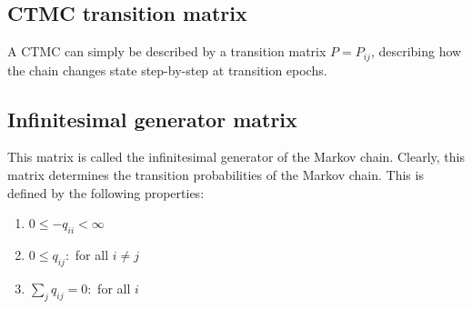 \documentclass[conference]{IEEEtran}
\begin{document}
\subsection{CTMC transition matrix}

A CTMC can simply be described by a transition matrix  \( P = P_{ij} \), describing how the chain changes state step-by-step at transition epochs.
\\


\subsection{Infinitesimal generator matrix}
This matrix is called the infinitesimal generator of the Markov chain. Clearly, this matrix determines the transition probabilities of the Markov chain. This is defined by the following properties:
\bigskip
\begin{enumerate}
\item \( 0 \leq -q_{ii} < \infty  \)
\item \( 0 \leq q_{ij} :\) for all \( i \neq j  \)
\item \( \sum_j q_{ij} = 0 :\) for all \( i \)

\end{enumerate}
\end{document}
